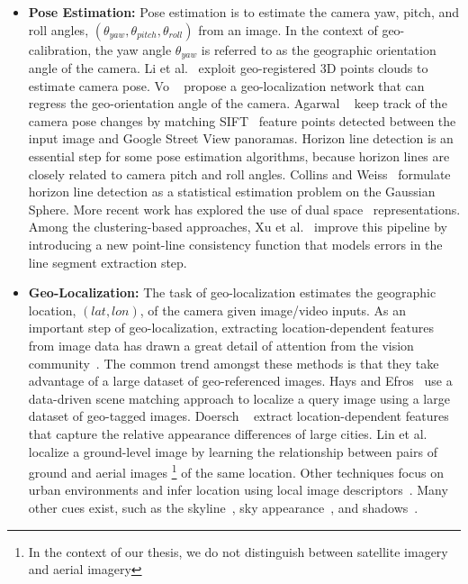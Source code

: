 \begin{itemize}[noitemsep]

\item \textbf{Pose Estimation:}
Pose estimation is to estimate the camera yaw, pitch, and roll
angles, $(\theta_{yaw}, \theta_{pitch}, \theta_{roll})$ from an
image. In the context of geo-calibration, the yaw angle
$\theta_{yaw}$ is referred to as the geographic orientation angle of
the camera.
%
Li et al.~\cite{li2012worldwide} exploit geo-registered 3D points
clouds to estimate camera pose.
Vo \etal~\cite{vo2016localizing} propose a geo-localization network
that can regress the geo-orientation angle of the camera.
Agarwal \etal~\cite{agarwal2015metric} keep track of the camera pose
changes by matching SIFT~\cite{lowe1999object} feature points detected
between the input image and Google Street View panoramas.
%
Horizon line detection is an essential step for some pose
estimation algorithms, because horizon lines are closely related to
camera pitch and roll angles.
Collins and Weiss~\cite{unitsphere1990} formulate horizon line
detection as a statistical estimation problem on the Gaussian Sphere.
More recent work has explored the use of dual
space~\cite{alignment2014,dualspace2013} representations. Among the
clustering-based approaches, Xu et al.~\cite{kitware2013} improve this
pipeline by introducing a new point-line consistency function that
models errors in the line segment extraction step.
\newline

\item \textbf{Geo-Localization:}
The task of geo-localization estimates the geographic location, $(lat,
lon)$, of the camera given image/video inputs.
%
As an important step of geo-localization, extracting
location-dependent features from image data has drawn a great detail
of attention from the vision community~\cite{jacobs07geolocate,
jacobs11geolocate, jacobs08geoorient}. The common trend amongst these
methods is that they take advantage of a large dataset of
geo-referenced images. Hays and Efros~\cite{hays2008im2gps} use a
data-driven scene matching approach to localize a query image using a
large dataset of geo-tagged images.  Doersch
\etal~\cite{doersch2012what} extract location-dependent features that
capture the relative appearance differences of large cities.  Lin et
al.~\cite{lin2013cross} localize a ground-level image by learning the
relationship between pairs of ground and aerial images \footnote{In
the context of our thesis, we do not distinguish between satellite
imagery and aerial imagery} of the same location. Other techniques
focus on urban environments and infer location using local image
descriptors~\cite{schindler2008detecting,snavely2006photo}.  Many
other cues exist, such as the
skyline~\cite{baatz2012large,ramalingam2009geolocalization}, sky
appearance~\cite{lalonde2010sun,workman2014rainbow}, and
shadows~\cite{junejo2008estimating,wu2010geo}.
\newline


\end{itemize}
